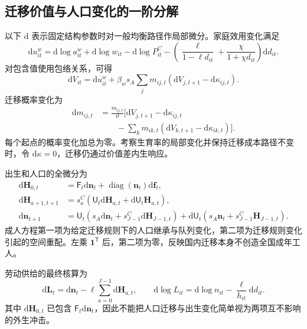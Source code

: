 \documentclass[UTF8,a4paper,zihao=-4,fontset=windows]{ctexart}
\numberwithin{equation}{section}
\newcommand{\pc}{P^{C}}
\newcommand{\dd}{\mathrm{d}}
\newcommand{\ones}{\bm{1}}
\DeclareMathOperator{\diag}{diag}
\begin{document}
\subsection{迁移价值与人口变化的一阶分解}
以下 $\dd$ 表示固定结构参数时对一般均衡路径作局部微分。家庭效用变化满足
\begin{equation}
 \dd u^w_{it}=\dd\log a^w_{it}+\dd\log w_{it}-\dd\log\pc_{it}
 -\left(\frac{\ell}{1-\ell d_{it}}+\frac{\chi}{1+\chi d_{it}}\right)\dd d_{it}.
 \label{eq:lg-flow-differential}
\end{equation}
对包含值使用包络关系，可得
\begin{equation}
 \dd V_{it}=\dd u^w_{it}+\beta_ws_A\sum_jm_{ij,t}
 \left(\dd V_{j,t+1}-\dd\kappa_{ij,t}\right).
 \label{eq:lg-value-differential}
\end{equation}
迁移概率变化为
\begin{align}
 \dd m_{ij,t}&=\frac{m_{ij,t}}{\vartheta}\Bigg[
 \dd V_{j,t+1}-\dd\kappa_{ij,t}\\
 &\qquad-\sum_km_{ik,t}\left(\dd V_{k,t+1}-\dd\kappa_{ik,t}\right)\Bigg].
 \label{eq:lg-migration-differential}
\end{align}
每个起点的概率变化加总为零。考察生育率的局部变化并保持迁移成本路径不变时，令 $\dd\kappa=0$，迁移仍通过价值差内生响应。

出生和人口的全微分为
\begin{align}
 \dd\bm H_{0,t}&=\mathsf F_t\dd\bm n_t
 +\diag(\bm n_t)\dd\bm f_t,\label{eq:lg-birth-differential}\\
 \dd\bm H_{a+1,t+1}&=s^C_a\left(
 \mathsf U_t\dd\bm H_{a,t}+\dd\mathsf U_t\bm H_{a,t}\right),\\
 \dd\bm n_{t+1}&=\mathsf U_t\left(s_A\dd\bm n_t
 +s^C_{J-1}\dd\bm H_{J-1,t}\right)
 +\dd\mathsf U_t\left(s_A\bm n_t+s^C_{J-1}\bm H_{J-1,t}\right).
 \label{eq:lg-adult-differential}
\end{align}
成人方程第一项为给定迁移规则下的人口继承与队列变化，第二项为迁移规则变化引起的空间重配。左乘 $\ones^{\mathsf T}$ 后，第二项为零，反映国内迁移本身不创造全国成年工人。

劳动供给的最终核算为
\begin{equation}
 \dd\bm L_t=\dd\bm n_t-\ell\sum_{a=0}^{J-1}\dd\bm H_{a,t},\qquad
 \dd\log L_{it}=\dd\log n_{it}-\frac{\ell}{h_{it}}\dd d_{it}.
 \label{eq:lg-total-labor-differential}
\end{equation}
其中 $\dd\bm H_{0,t}$ 已包含 $\mathsf F_t\dd\bm n_t$，因此不能把人口迁移与出生变化简单视为两项互不影响的外生冲击。
\end{document}
